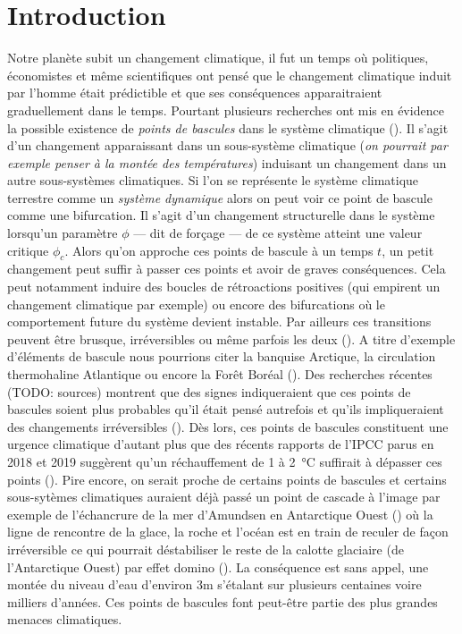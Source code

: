 \section{Introduction}

Notre planète subit un changement climatique, il fut un temps où politiques, économistes et même scientifiques ont pensé que le changement climatique induit par l'homme était prédictible et que ses conséquences apparaitraient graduellement dans le temps. Pourtant plusieurs recherches ont mis en évidence la possible existence de \emph{points de bascules} dans le système climatique (\cite{lenton_tipping_2008}). Il s'agit d'un changement apparaissant dans un sous-système climatique (\emph{on pourrait par exemple penser à la montée des températures}) induisant un changement dans un autre sous-systèmes climatiques. Si l'on se représente le système climatique terrestre comme un \emph{système dynamique} alors on peut voir ce point de bascule comme une bifurcation. Il s'agit d'un changement structurelle dans le système lorsqu'un paramètre $\phi$ --- dit de forçage --- de ce système atteint une valeur critique $\phi_c$. Alors qu'on approche ces points de bascule à un temps $t$, un petit changement peut suffir à passer ces points et avoir de graves conséquences. Cela peut notamment induire des boucles de rétroactions positives (qui empirent un changement climatique par exemple) ou encore des bifurcations où le comportement future du système devient instable. Par ailleurs ces transitions peuvent être brusque, irréversibles ou même parfois les deux (\cite{Lenton_2012}). A titre d'exemple d'éléments de bascule nous pourrions citer la banquise Arctique, la circulation thermohaline Atlantique ou encore la Forêt Boréal (\cite{lenton_tipping_2008}). Des recherches récentes (TODO: sources) montrent que des signes indiqueraient que ces points de bascules soient plus probables qu'il était pensé autrefois et qu'ils impliqueraient des changements irréversibles (\cite{lenton_climate_2019_too_risky}). Dès lors, ces points de bascules constituent une urgence climatique d'autant plus que des récents rapports de l'IPCC parus en 2018 et 2019 suggèrent qu'un réchauffement de 1 à \SI{2}{\celsius} suffirait à dépasser ces points (\cite{ipcc_global_2018,portner_ipcc_2019}). Pire encore, on serait proche de certains points de bascules et certains sous-sytèmes climatiques auraient déjà passé un point de cascade à l'image par exemple de l'échancrure de la mer d'Amundsen en Antarctique Ouest (\cite{portner_ipcc_2019}) où la ligne de rencontre de la glace, la roche et l'océan est en train de reculer de façon irréversible ce qui pourrait déstabiliser le reste de la calotte glaciaire (de l'Antarctique Ouest) par effet domino (\cite{feldmann_collapse_2015_amundsen}). La conséquence est sans appel, une montée du niveau d'eau d'environ 3m s'étalant sur plusieurs centaines voire milliers d'années. Ces points de bascules font peut-être partie des plus grandes menaces climatiques.

